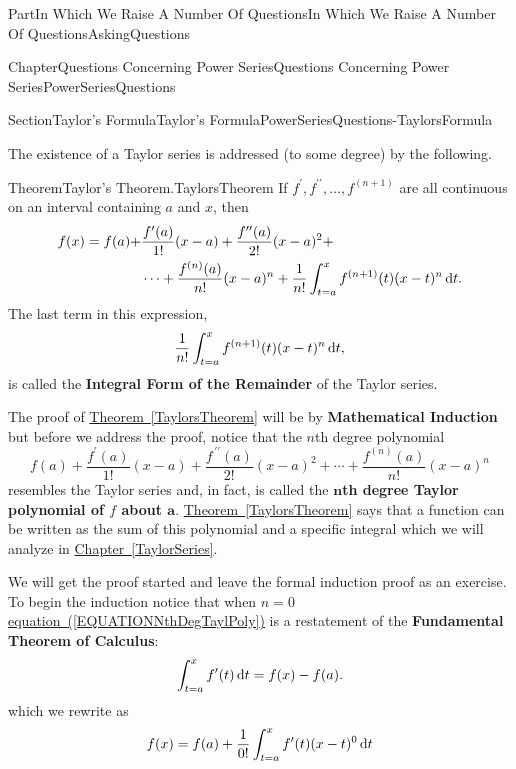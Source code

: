 \documentclass[oneside,10pt,]{book}
\newcommand{\xreffont}{\relax}
\newcommand{\terminology}[1]{\textbf{#1}}
\numberwithin{equation}{part}
\newcommand{\dx}[1]{\,{\rm d}#1}
\newcommand{\amp}{&}
\begin{document}
\begin{partptx}{Part}{In Which We Raise A Number Of Questions}{}{In Which We Raise A Number Of Questions}{}{}{AskingQuestions}
\begin{chapterptx}{Chapter}{Questions Concerning Power Series}{}{Questions Concerning Power Series}{}{}{PowerSeriesQuestions}
\begin{sectionptx}{Section}{Taylor's Formula}{}{Taylor's Formula}{}{}{PowerSeriesQuestions-TaylorsFormula}
\par
The existence of a Taylor series is addressed (to some degree) by the following.%
\begin{theorem}{Theorem}{Taylor's Theorem.}{}{TaylorsTheorem}%
%
If \(f^\prime, f^{\prime\prime}, \ldots, f^{(n+1)}\) are all continuous on an interval containing \(a\) and \(x\), then%
\begin{align*}
f(x)=f(a)+\amp{}\frac{f^{\prime}(a)}{1!}(x-a)+\frac{f^{\prime \prime}(a)}{2!}(x-a)^2 +\\
\amp{}\cdots+\frac{f^{(n)}(a)}{n!}(x-a)^n + \frac{1}{n!}\int_{t=a}^xf^{(n+1)}(t)(x-t)^n\dx{t}\text{.}
\end{align*}
The last term in this expression,%
\begin{equation*}
\frac{1}{n!}\int_{t=a}^xf^{(n+1)}(t)(x-t)^n\dx{t}\text{,}
\end{equation*}
is called the \terminology{Integral Form of the Remainder} of the Taylor series.%
\end{theorem}
The proof of \hyperref[TaylorsTheorem]{Theorem~{\xreffont\ref{TaylorsTheorem}}} will be by \terminology{Mathematical Induction} but before we address the proof, notice that the \(n\)th degree polynomial%
\begin{equation}
f(a)+\frac{f^{\prime}(a)}{1!}(x-a)+\frac{f^{\,\prime\prime}(a)}{2!}(x-a)^2+\cdots+\frac{f^{(n)}(a)}{n!}(x-a)^n\label{EQUATIONNthDegTaylPoly}
\end{equation}
resembles the Taylor series and, in fact, is called the \terminology{\(\boldsymbol n\)th degree Taylor polynomial of \(f\) about \(\boldsymbol a\)}.  \hyperref[TaylorsTheorem]{Theorem~{\xreffont\ref{TaylorsTheorem}}} says that a function can be written as the sum of this polynomial and a specific integral which we will analyze in \hyperref[TaylorSeries]{Chapter~{\xreffont\ref{TaylorSeries}}}.%
\par
We will get the proof started and leave the formal induction proof as an exercise. To begin the induction notice that when \(n=0\) \hyperref[EQUATIONNthDegTaylPoly]{equation~({\xreffont\ref{EQUATIONNthDegTaylPoly}})} is  a restatement of the \terminology{Fundamental Theorem of Calculus}:%
\begin{equation*}
\int_{t=a}^xf^\prime(t)\dx{t}=f(x)-f(a)\text{.}
\end{equation*}
which we rewrite  as%
\begin{equation*}
f(x)=f(a)+\frac{1}{0!}\int_{t=a}^xf^\prime(t)(x-t)^0\dx{t}
\end{equation*}

\end{sectionptx}
\end{chapterptx}
\end{partptx}
\end{document}
